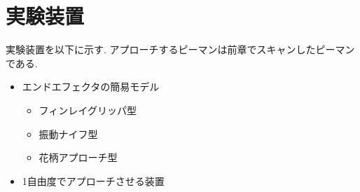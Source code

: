 \section{実験装置}
実験装置を以下に示す. アプローチするピーマンは前章でスキャンしたピーマンである.
\begin{itemize}
  \item エンドエフェクタの簡易モデル
  \begin{itemize}
    \item フィンレイグリッパ型
    \item 振動ナイフ型
    \item 花柄アプローチ型
  \end{itemize}
  \item 1自由度でアプローチさせる装置
\end{itemize}